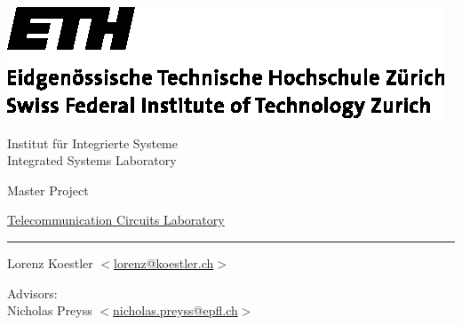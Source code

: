 \begin{center}

  \vspace*{-2cm}
  \begin{minipage}{\textwidth}
    \begin{minipage}{68mm}
      \includegraphics{ethlogo}
    \end{minipage} \hfill
    \begin{minipage}{50mm}
      \vspace{8.7mm}
      \begin{flushright}
         {\footnotesize Institut f\" ur Integrierte Systeme\\
          \vspace{-0.75mm} Integrated Systems Laboratory}
      \end{flushright}
    \end{minipage}
  \end{minipage}

  \vspace{3cm}

  \begin{flushright}
    {\LARGE Master Project}\\
    \vspace{5mm}

    \href{http://tcl.epfl.ch}{Telecommunication Circuits Laboratory}


    \vspace{1.5cm} {\LARGE \bfseries \mytitle}
    \rule{\textwidth}{0.8mm}

    \vspace{2cm}

    Lorenz Koestler $ < $\href{mailto:lorenz@koestler.ch}{lorenz@koestler.ch}$ > $ \\

    \vspace{4cm}

    \myterm

    \vspace{2cm}
    Advisors: \\
    Nicholas Preyss $ < $\href{mailto:nicholas.preyss@epfl.ch}{nicholas.preyss@epfl.ch}$ > $ \\

  \end{flushright}
\end{center}
\newpage
